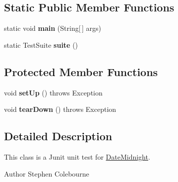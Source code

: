 \subsection*{Static Public Member Functions}
\begin{DoxyCompactItemize}
\item 
\hypertarget{classorg_1_1joda_1_1time_1_1_test_date_midnight___constructors_a39b7a8730980cea6f4ba6292290cb42b}{static void {\bfseries main} (String\mbox{[}$\,$\mbox{]} args)}\label{classorg_1_1joda_1_1time_1_1_test_date_midnight___constructors_a39b7a8730980cea6f4ba6292290cb42b}

\item 
\hypertarget{classorg_1_1joda_1_1time_1_1_test_date_midnight___constructors_a957dec6f3e09bf88cfc1b90fc2436460}{static Test\-Suite {\bfseries suite} ()}\label{classorg_1_1joda_1_1time_1_1_test_date_midnight___constructors_a957dec6f3e09bf88cfc1b90fc2436460}

\end{DoxyCompactItemize}
\subsection*{Protected Member Functions}
\begin{DoxyCompactItemize}
\item 
\hypertarget{classorg_1_1joda_1_1time_1_1_test_date_midnight___constructors_a96c6f8c2dd71976530c9a83a5a5ef102}{void {\bfseries set\-Up} ()  throws Exception }\label{classorg_1_1joda_1_1time_1_1_test_date_midnight___constructors_a96c6f8c2dd71976530c9a83a5a5ef102}

\item 
\hypertarget{classorg_1_1joda_1_1time_1_1_test_date_midnight___constructors_afc3dab4d4908f2944b26aecbadb8b9fe}{void {\bfseries tear\-Down} ()  throws Exception }\label{classorg_1_1joda_1_1time_1_1_test_date_midnight___constructors_afc3dab4d4908f2944b26aecbadb8b9fe}

\end{DoxyCompactItemize}


\subsection{Detailed Description}
This class is a Junit unit test for \hyperlink{classorg_1_1joda_1_1time_1_1_date_midnight}{Date\-Midnight}.

\begin{DoxyAuthor}{Author}
Stephen Colebourne 
\end{DoxyAuthor}


